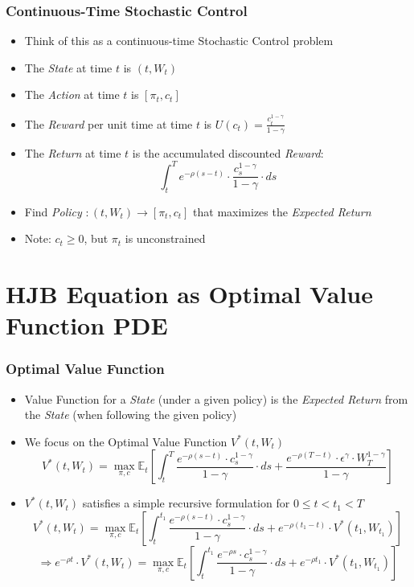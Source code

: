 \documentclass[handout]{beamer}
\begin{document}
\begin{frame}
\frametitle{Continuous-Time Stochastic Control}
\begin{itemize}[<+->]
\item Think of this as a continuous-time Stochastic Control problem
\item The {\em State} at time $t$ is $(t, W_t)$
\item The {\em Action} at time $t$ is $[\pi_t, c_t]$
\item The {\em Reward} per unit time at time $t$ is $U(c_t) = \frac {c_t^{1 - \gamma}} {1 - \gamma}$ 
\item The {\em Return} at time $t$ is the accumulated discounted {\em Reward}:
$$\int_t^T e^{-\rho(s-t)} \cdot \frac {c_s^{1-\gamma}} {1-\gamma} \cdot ds$$
\item Find {\em Policy} $: (t, W_t) \rightarrow [\pi_t, c_t]$ that maximizes the {\em Expected Return}
\item Note: $c_t \geq 0$, but $\pi_t$ is unconstrained
\end{itemize}
\end{frame}


\section{HJB Equation as Optimal Value Function PDE}

\begin{frame}
\frametitle{Optimal Value Function}
\begin{itemize}[<+->]
\item Value Function for a {\em State} (under a given policy) is the {\em Expected Return} from the {\em State} (when following the given policy)
\item We focus on the Optimal Value Function $V^*(t, W_t)$
$$V^*(t, W_t) = \max_{\pi, c} \mathbb{E}_t[\int_t^T \frac {e^{-\rho (s-t)} \cdot c_s^{1-\gamma}}{1 - \gamma} \cdot ds + \frac {e^{-\rho (T-t)} \cdot \epsilon^{\gamma} \cdot W_T^{1-\gamma}} {1 - \gamma} ]$$
\item $V^*(t, W_t)$ satisfies a simple recursive formulation for $0 \leq t < t_1 < T$
$$V^*(t, W_t) = \max_{\pi, c} \mathbb{E}_t[ \int_t^{t_1} \frac {e^{-\rho (s-t)} \cdot c_s^{1-\gamma}} {1 - \gamma} \cdot ds + e^{-\rho(t_1-t)} \cdot V^*(t_1, W_{t_1})]$$
\pause
$$\Rightarrow e^{-\rho t} \cdot V^*(t, W_t) = \max_{\pi, c} \mathbb{E}_t[ \int_t^{t_1} \frac {e^{-\rho s} \cdot c_s^{1-\gamma}} {1 - \gamma} \cdot ds + e^{-\rho t_1} \cdot V^*(t_1, W_{t_1})]$$
\end{itemize}
\end{frame}
\end{document}
